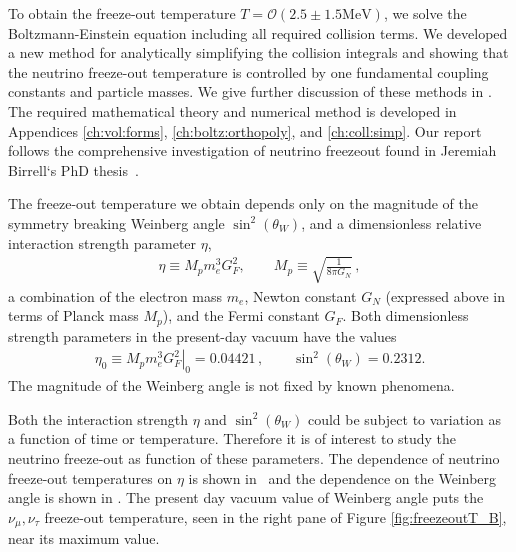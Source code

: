 To obtain the freeze-out temperature $T=\mathcal{O}(2.5\pm1.5\mathrm{MeV})$, we  solve the Boltzmann-Einstein equation including all required  collision terms. 
We developed a new method for analytically simplifying the collision integrals and showing that the neutrino freeze-out temperature is controlled by one fundamental coupling constants and particle masses.  We give further discussion of these methods in . The required mathematical theory and numerical method is developed in Appendices \ref{ch:vol:forms}, \ref{ch:boltz:orthopoly}, and \ref{ch:coll:simp}. Our report follows the comprehensive investigation of neutrino freezeout found in Jeremiah Birrell‘s PhD thesis~\cite{Birrell:2014ona}. 

The freeze-out temperature we obtain depends only on the magnitude of the symmetry breaking Weinberg angle $\sin^2(\theta_W)$, and a dimensionless relative interaction strength parameter $\eta$,
\begin{align}\label{etaCTY}
\eta\equiv M_p m_e^3 G_F^2, \qquad M_p\equiv\sqrt{\frac{1}{8\pi G_N}}\,, 
\end{align}
a combination of the electron mass $m_e$, Newton constant $G_N$ (expressed above in terms of Planck mass $M_p$), and the Fermi constant $G_F$. Both  dimensionless  strength parameters in the present-day vacuum have the values
\begin{align}\label{eta0CTY}
\eta_0\equiv \left.M_p m_e^3 G_F^2\right|_0 = 0.04421\,, \qquad  \sin^2(\theta_W)=0.2312.
\end{align}
The magnitude of the Weinberg angle is not fixed by known phenomena. 

Both the interaction strength $\eta$ and $\sin^2(\theta_W)$ could be subject to variation as a function of time or temperature. Therefore it is of interest to study the neutrino freeze-out as function of these parameters.   The dependence of neutrino freeze-out temperatures on $\eta$ is shown in~ and the dependence on the Weinberg angle is shown in  . The present day vacuum value of Weinberg angle puts the $\nu_\mu,\nu_\tau$ freeze-out temperature, seen in the right pane of Figure \ref{fig:freezeoutT_B},  near its maximum value. 
 
